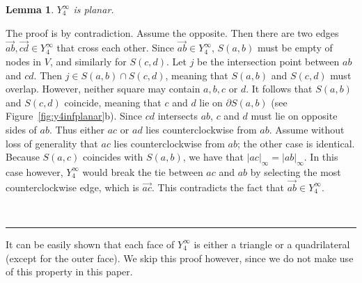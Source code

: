 \pdfoutput=1  \documentclass[11pt]{article}
\newtheorem{lemma}{Lemma}
\newcommand{\qed}{\rule{0.5em}{1.5ex}}
\newcommand{\fqed}{{\hfill~\qed}}
\newenvironment{proof}{{\noindent \bf Proof.}}
                      {{\hfill \fqed} \vspace{1em}}
\begin{document}
\begin{lemma}
$Y^\infty_4$ is planar.
\label{lem:y4infplanar}
\end{lemma}
\begin{proof}
The proof is by contradiction. Assume the opposite. Then there are
two edges $\overrightarrow{ab}, \overrightarrow{cd} \in Y^\infty_4$
that cross each other. Since $\overrightarrow{ab} \in Y^\infty_4$,
$S(a,b)$ must be empty of nodes in $V$, and similarly for $S(c,d)$. Let
$j$ be the intersection point between $ab$ and $cd$.
Then $j \in S(a,b) \cap S(c,d)$, meaning that $S(a,b)$ and $S(c,d)$ must
overlap. However, neither square may contain $a, b, c$ or $d$. It
follows that $S(a,b)$ and $S(c,d)$ coincide, meaning that $c$ and $d$
lie on $\partial S(a,b)$ (see Figure~\ref{fig:y4infplanar}b). Since $cd$
intersects $ab$, $c$ and $d$ must lie on opposite sides of $ab$.  Thus either $ac$ or
$ad$ lies counterclockwise from $ab$. Assume without loss of generality that
$ac$ lies counterclockwise from $ab$; the other case is identical.
Because $S(a,c)$ coincides with $S(a,b)$, we have that
$|ac|_\infty = |ab|_\infty$. In this case however, $Y^\infty_4$ would break
the tie between $ac$ and $ab$ by selecting the most counterclockwise edge,
which is $\overrightarrow{ac}$. This contradicts the fact that
$\overrightarrow{ab} \in Y^\infty_4$.
\end{proof}

\noindent
It can be easily shown that each face of $Y^\infty_4$ is either a triangle
or a quadrilateral (except for the outer face). We skip this proof however,
since we do not make use of this property in this paper.
\end{document}
